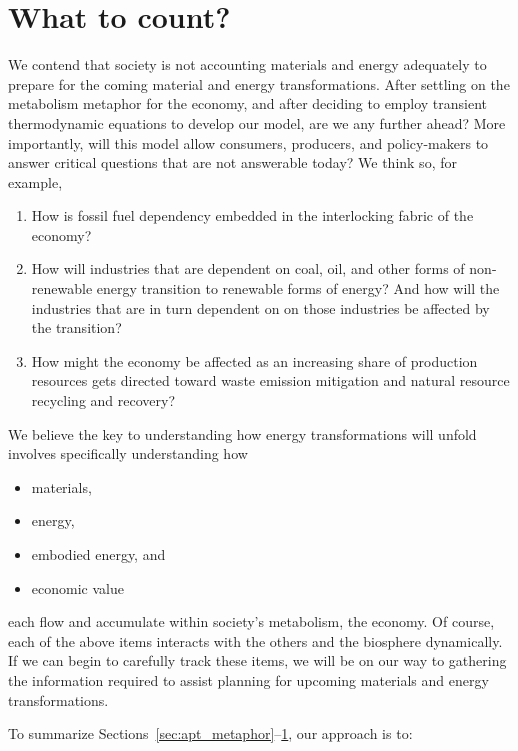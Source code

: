 \section{What to count?}
\label{sec:what_to_count}
We contend that society is not accounting materials and energy adequately 
to prepare for the coming material and energy transformations.
After settling on the metabolism metaphor for the economy, 
and after deciding to employ transient thermodynamic equations to develop our model, 
are we any further ahead?
More importantly, will this model allow consumers, producers,
and policy-makers to answer critical questions that are not
answerable today? We think so, 
for example,
\begin{enumerate}
    \item{How is fossil fuel dependency embedded in the interlocking fabric of the economy?} 
    \item{How will industries that are dependent on coal, oil, 
 			and other forms of non-renewable energy transition 
			to renewable forms of energy? And how will the industries that 
			are in turn dependent on on those industries be affected
			by the transition?} 
	\item{How might the economy be affected as an increasing share of production resources
			 gets directed toward
 			waste emission mitigation and natural resource recycling and recovery?}
\end{enumerate}


We believe the key to understanding how energy transformations will unfold
involves specifically understanding how

\begin{itemize}
	\item{materials,}
	\item{energy,}
	\item{embodied energy, and}
	\item{economic value}
\end{itemize}

\noindent{}each flow and accumulate within society's metabolism, the economy.
Of course, each of the above items interacts with the others 
and the biosphere dynamically.
If we can begin to carefully track these items, 
we will be on our way to gathering the information required to 
assist planning for upcoming materials and energy transformations.

To summarize Sections~\ref{sec:apt_metaphor}--\ref{sec:what_to_count}, 
our approach is to:

